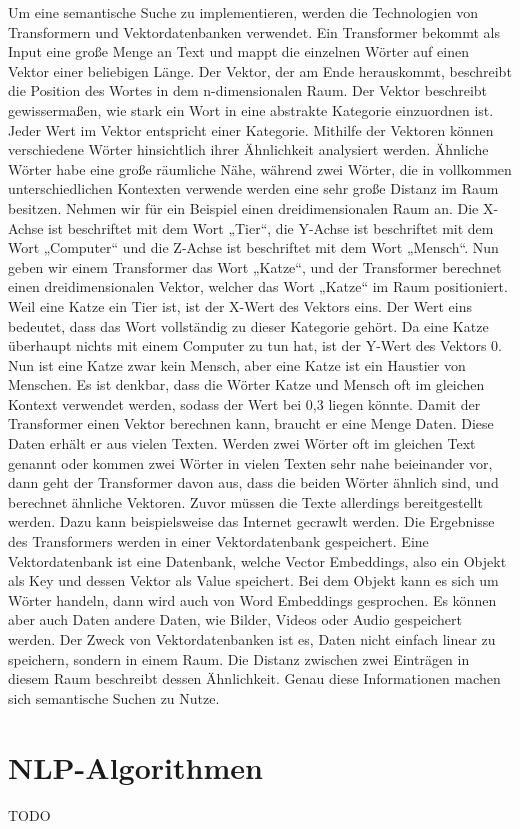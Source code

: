 Um eine semantische Suche zu implementieren, werden die Technologien von Transformern und Vektordatenbanken verwendet. Ein Transformer bekommt als Input eine große Menge an Text und mappt die einzelnen Wörter auf einen Vektor einer beliebigen Länge. Der Vektor, der am Ende herauskommt, beschreibt die Position des Wortes in dem n-dimensionalen Raum. Der Vektor beschreibt gewissermaßen, wie stark ein Wort in eine abstrakte Kategorie einzuordnen ist. Jeder Wert im Vektor entspricht einer Kategorie. Mithilfe der Vektoren können verschiedene Wörter hinsichtlich ihrer Ähnlichkeit analysiert werden. Ähnliche Wörter habe eine große räumliche Nähe, während zwei Wörter, die in vollkommen unterschiedlichen Kontexten verwende werden eine sehr große Distanz im Raum besitzen.
Nehmen wir für ein Beispiel einen dreidimensionalen Raum an. Die X-Achse ist beschriftet mit dem Wort „Tier“, die Y-Achse ist beschriftet mit dem Wort „Computer“ und die Z-Achse ist beschriftet mit dem Wort „Mensch“. Nun geben wir einem Transformer das Wort „Katze“, und der Transformer berechnet einen dreidimensionalen Vektor, welcher das Wort „Katze“ im Raum positioniert. Weil eine Katze ein Tier ist, ist der X-Wert des Vektors eins.  Der Wert eins bedeutet, dass das Wort vollständig zu dieser Kategorie gehört. Da eine Katze überhaupt nichts mit einem Computer zu tun hat, ist der Y-Wert des Vektors 0. Nun ist eine Katze zwar kein Mensch, aber eine Katze ist ein Haustier von Menschen. Es ist denkbar, dass die Wörter Katze und Mensch oft im gleichen Kontext verwendet werden, sodass der Wert bei 0,3 liegen könnte.
Damit der Transformer einen Vektor berechnen kann, braucht er eine Menge Daten. Diese Daten erhält er aus vielen Texten. Werden zwei Wörter oft im gleichen Text genannt oder kommen zwei Wörter in vielen Texten sehr nahe beieinander vor, dann geht der Transformer davon aus, dass die beiden Wörter ähnlich sind, und berechnet ähnliche Vektoren. Zuvor müssen die Texte allerdings bereitgestellt werden. Dazu kann beispielsweise das Internet gecrawlt werden.
Die Ergebnisse des Transformers werden in einer Vektordatenbank gespeichert. Eine Vektordatenbank ist eine Datenbank, welche Vector Embeddings, also ein Objekt als Key und dessen Vektor als Value speichert. Bei dem Objekt kann es sich um Wörter handeln, dann wird auch von Word Embeddings gesprochen. Es können aber auch Daten andere Daten, wie Bilder, Videos oder Audio gespeichert werden. Der Zweck von Vektordatenbanken ist es, Daten nicht einfach linear zu speichern, sondern in einem Raum. Die Distanz zwischen zwei Einträgen in diesem Raum beschreibt dessen Ähnlichkeit. Genau diese Informationen machen sich semantische Suchen zu Nutze.

\section{NLP-Algorithmen}

TODO